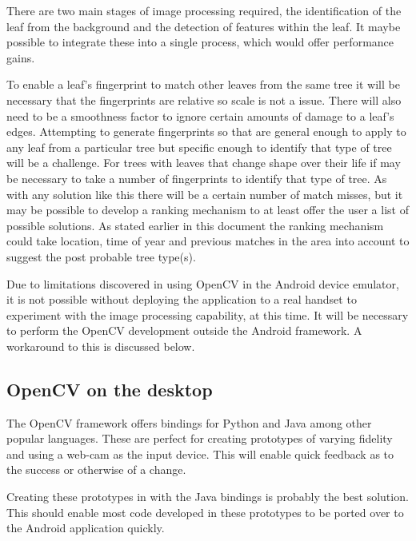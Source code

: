There are two main stages of image processing required, the identification of the leaf from the background and the detection of features within the leaf.  It maybe possible to integrate these into a single process, which would offer performance gains. 

To enable a leaf’s fingerprint to match other leaves from the same tree it will be necessary that the fingerprints are relative so scale is not a issue. There will also need to be a smoothness factor to ignore certain amounts of damage to a leaf’s edges. Attempting to generate fingerprints so that are general enough to apply to any leaf from a particular tree but specific enough to identify that type of tree will be a challenge. For trees with leaves that change shape over their life if may be necessary to take a number of fingerprints to identify that type of tree. As with any solution like this there will be a certain number of match misses, but it may be possible to develop a ranking mechanism to at least offer the user a list of possible solutions. As stated earlier in this document the ranking mechanism could take location, time of year and previous matches in the area into account to suggest the post probable tree type(s).

Due to limitations discovered in using OpenCV in the Android device emulator, it is not possible without deploying the application to a real handset to experiment with the image processing capability, at this time. It will be necessary to perform the OpenCV development outside the Android framework. A workaround to this is discussed below. 

\subsection*{OpenCV on the desktop}
The OpenCV framework offers bindings for Python and Java among other popular languages. These are perfect for creating prototypes of varying fidelity and using a web-cam as the input device. This will enable quick feedback as to the success or otherwise of a change.

Creating these prototypes in with the Java bindings is probably the best solution. This should enable most code developed in these prototypes to be ported over to the Android application quickly.
